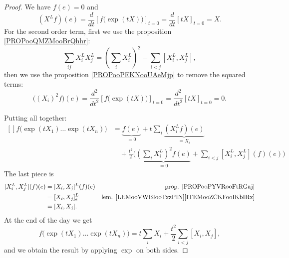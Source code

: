 \begin{theorem}
\begin{proof}
	We have \( f(e)=0\) and
	\begin{equation}
		(X^Lf)(e)=\frac{d}{dt} \left[ f\big( \exp(tX) \big)  \right]_{t=0}=\frac{d}{dt} \left[ tX  \right]_{t=0}=X.
	\end{equation}
	For the second order term, first we use the proposition \ref{PROPooQMZMooBrQhhr}:
	\begin{equation}
		\sum_{ij}X_i^LX_j^L=(\sum_iX_i^L)^2+\sum_{i<j}[X_i^L,X_j^L],
	\end{equation}
	then we use the proposition \ref{PROPooPEKNooUAeMjp} to remove the squared terms:
	\begin{equation}
		\big( (X_i)^2f \big)(e)=\frac{d^2}{dt^2} \left[ f\big( \exp(tX) \big)  \right]_{t=0}=\frac{d^2}{dt^2} \left[   tX  \right]_{t=0}=0.
	\end{equation}

	Putting all together:
	\begin{equation}
		\begin{aligned}[]
			f\big( \exp(tX_1)\ldots \exp(tX_n) \big) & =\underbrace{f(e)}_{=0}+t\sum_i\underbrace{(X_i^Lf)(e)}_{=X_i}                                        \\
			                                         & \quad+\frac{ t^2 }{2}\Big( \underbrace{(\sum_iX_i^L)^2f(e)}_{=0} +\sum_{i<j}[X_i^L,X_j^L](f)(e) \Big)
		\end{aligned}
	\end{equation}
	The last piece is
	\begin{subequations}
		\begin{align}
			[X_i^L,X_j^L](f)(e) & =[X_i,X_j]^L(f)(e) & \text{prop. \ref{PROPooPYVRooFtRGaj}}                       \\
			                    & =[X_i,X_j]^L_e     & \text{lem. \ref{LEMooVWBIooTxzPIN}\ref{ITEMooZCKFooIKbIRx}} \\
			                    & =[X_i,X_j].
		\end{align}
	\end{subequations}
	At the end of the day we get
	\begin{equation}
		f\big( \exp(tX_1)\ldots \exp(tX_n) \big)=t\sum_iX_i+\frac{ t^2 }{2}\sum_{i<j}[X_i,X_j],
	\end{equation}
	and we obtain the result by applying \( \exp\) on both sides.
\end{proof}


\end{theorem}
